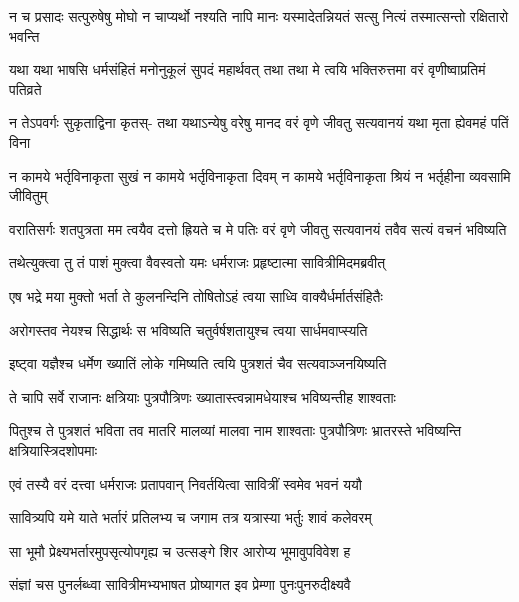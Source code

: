 \begin{center}
\fourlineindentedshloka
{न च प्रसादः सत्पुरुषेषु मोघो}
{न चाप्यर्थो नश्यति नापि मानः}
{यस्मादेतन्नियतं सत्सु नित्यं}
{तस्मात्सन्तो रक्षितारो भवन्ति}



\fourlineindentedshloka
{यथा यथा भाषसि धर्मसंहितं}
{मनोनुकूलं सुपदं महार्थवत्}
{तथा तथा मे त्वयि भक्तिरुत्तमा}
{वरं वृणीष्वाप्रतिमं पतिव्रते}




\fourlineindentedshloka
{न तेऽपवर्गः सुकृताद्विना कृतस्-}
{तथा यथाऽन्येषु वरेषु मानद}
{वरं वृणे जीवतु सत्यवानयं}
{यथा मृता ह्येवमहं पतिं विना}


\fourlineindentedshloka
{न कामये भर्तृविनाकृता सुखं}
{न कामये भर्तृविनाकृता दिवम्}
{न कामये भर्तृविनाकृता श्रियं}
{न भर्तृहीना व्यवसामि जीवितुम्}


\fourlineindentedshloka
{वरातिसर्गः शतपुत्रता मम}
{त्वयैव दत्तो ह्रियते च मे पतिः}
{वरं वृणे जीवतु सत्यवानयं}
{तवैव सत्यं वचनं भविष्यति}




\twolineshloka
{तथेत्युक्त्वा तु तं पाशं मुक्त्वा वैवस्वतो यमः}
{धर्मराजः प्रहृष्टात्मा सावित्रीमिदमब्रवीत्}


\twolineshloka
{एष भद्रे मया मुक्तो भर्ता ते कुलनन्दिनि}
{तोषितोऽहं त्वया साध्वि वाक्यैर्धर्मार्तसंहितैः}


\twolineshloka
{अरोगस्तव नेयश्च सिद्धार्थः स भविष्यति}
{चतुर्वर्षशतायुश्च त्वया सार्धमवाप्स्यति}


\twolineshloka
{इष्ट्वा यज्ञैश्च धर्मेण ख्यातिं लोके गमिष्यति}
{त्वयि पुत्रशतं चैव सत्यवाञ्जनयिष्यति}


\twolineshloka
{ते चापि सर्वे राजानः क्षत्रियाः पुत्रपौत्रिणः}
{ख्यातास्त्वन्नामधेयाश्च भविष्यन्तीह शाश्वताः}


\threelineshloka
{पितुश्च ते पुत्रशतं भविता तव मातरि}
{मालव्यां मालवा नाम शाश्वताः पुत्रपौत्रिणः}
{भ्रातरस्ते भविष्यन्ति क्षत्रियास्त्रिदशोपमाः}


\twolineshloka
{एवं तस्यै वरं दत्त्वा धर्मराजः प्रतापवान्}
{निवर्तयित्वा सावित्रीं स्वमेव भवनं ययौ}


\twolineshloka
{सावित्र्यपि यमे याते भर्तारं प्रतिलभ्य च}
{जगाम तत्र यत्रास्या भर्तुः शावं कलेवरम्}


\twolineshloka
{सा भूमौ प्रेक्ष्यभर्तारमुपसृत्योपगृह्य च}
{उत्सङ्गे शिर आरोप्य भूमावुपविवेश ह}


\twolineshloka
{संज्ञां चस पुनर्लब्ध्वा सावित्रीमभ्यभाषत}
{प्रोष्यागत इव प्रेम्णा पुनःपुनरुदीक्ष्यवै}



\end{center}
